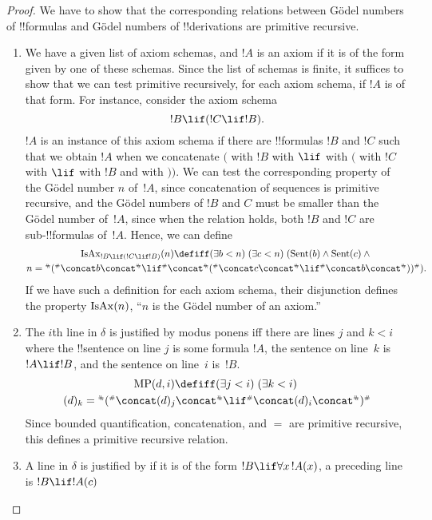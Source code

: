\documentclass[../../../include/open-logic-section]{subfiles}
\begin{document}
\begin{proof}
We have to show that the corresponding relations between G\"odel
numbers of !!{formula}s and  G\"odel numbers of !!{derivation}s 
are primitive recursive.
\begin{enumerate}
\item We have a given list of axiom schemas, and $!A$ is an axiom if
  it is of the form given by one of these schemas.  Since the list of
  schemas is finite, it suffices to show that we can test primitive
  recursively, for each axiom schema, if $!A$ is of that form. For
  instance, consider the axiom schema
  \[
  !B \lif (!C \lif !B).
  \]
  $!A$ is an instance of this axiom schema if there are !!{formula}s
  $!B$ and $!C$ such that we obtain $!A$ when we concatenate $($ with
  $!B$ with $\lif$ with $($ with $!C$ with $\lif$ with $!B$ and with
  $))$. We can test the corresponding property of the G\"odel number
  $n$ of~$!A$, since concatenation of sequences is primitive
  recursive, and the G\"odel numbers of $!B$ and $C$ must be smaller
  than the G\"odel number of~$!A$, since when the relation holds, both
  $!B$ and $!C$ are sub-!!{formula}s of~$!A$. Hence, we can define
  \begin{multline*}
  \fn{IsAx}_{!B \lif (!C \lif !B)}(n) \defiff \bexists{b< n}{
    \bexists{c < n}{(\fn{Sent}(b) \land \fn{Sent}(c) \land {}}}\\ n =
  \Gn{(} \concat b \concat \Gn{\lif} \concat \Gn{(} \concat c \concat
  \Gn{\lif} \concat b \concat \Gn{))}).
  \end{multline*}
  If we have such a definition for each axiom schema, their
  disjunction defines the property $\mathrm{IsAx}(n)$, ``$n$ is the
  G\"odel number of an axiom.''
\item The $i$th line in $\delta$ is justified by modus ponens iff there
  are lines $j$ and $k < i$ where the !!{sentence} on line $j$ is some
  formula $!A$, the sentence on line~$k$ is $!A \lif !B$, and the
  sentence on line~$i$ is~$!B$.
  \begin{multline*}
    \fn{MP}(d, i) \defiff \bexists{j < i}{\bexists{k < i}{}}\\
    (d)_k = \Gn{(} \concat (d)_j
      \concat \Gn{\lif} \concat (d)_i \concat \Gn{)}
  \end{multline*}
  Since bounded quantification, concatenation, and $=$ are primitive
  recursive, this defines a primitive recursive relation. 
\item A line in $\delta$ is justified by \QR{} if it is of the form
  $!B \lif \lforall[x][!A(x)]$, a preceding line is $!B \lif !A(c)$

\end{enumerate}
\end{proof}
\end{document}
